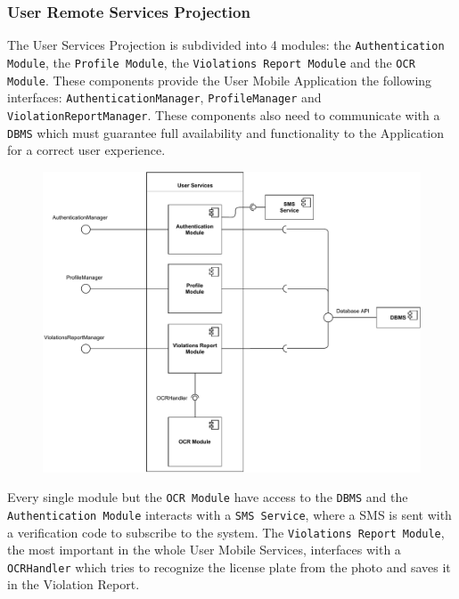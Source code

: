 \documentclass[12pt,a4paper]{article}
\begin{document}
\subsubsection{User Remote Services Projection}
The User Services Projection is subdivided into 4 modules: the \texttt{Authentication Module}, the \texttt{Profile Module}, the \texttt{Violations Report Module} and the \texttt{OCR Module}. These components provide the User Mobile Application the following interfaces: \texttt{AuthenticationManager}, \texttt{ProfileManager} and \texttt{ViolationReportManager}. These components also need to communicate with a \texttt{DBMS} which must guarantee full availability and functionality to the Application for a correct user experience.
\begin{figure}[H]
		\centering
		\includegraphics[width=1.2\linewidth]{../assets/images/user_projection.pdf}
	\end{figure}
Every single module but the \texttt{OCR Module} have access to the \texttt{DBMS} and the \texttt{Authentication Module} interacts with a \texttt{SMS Service}, where a SMS is sent with a verification code to subscribe to the system. The \texttt{Violations Report Module}, the most important in the whole User Mobile Services, interfaces with a \texttt{OCRHandler} which tries to recognize the license plate from the photo and saves it in the Violation Report.
\end{document}
